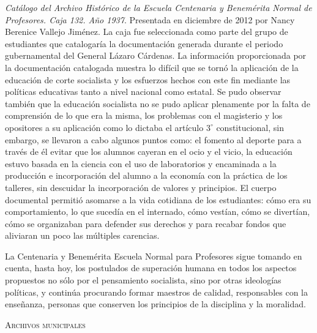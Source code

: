 \smallskip 
\noindent \textsl{Catálogo del Archivo Histórico de la 
Escuela Centenaria y Benemérita Normal de Profesores. Caja 132. Año 
1937}. Presentada en diciembre de 2012 por Nancy Berenice Vallejo 
Jiménez. La caja fue seleccionada como parte del grupo de estudiantes 
que catalogaría la documentación generada durante el periodo 
gubernamental del General Lázaro Cárdenas. La información proporcionada 
por la documentación catalogada muestra lo difícil que se tornó la 
aplicación de la educación de corte socialista y los esfuerzos hechos 
con este fin mediante las políticas educativas tanto a nivel nacional 
como estatal. Se pudo observar también que la educación  socialista no 
se pudo aplicar  plenamente por la falta de comprensión de lo que era 
la misma, los problemas con el magisterio y los opositores a su 
aplicación como lo dictaba el artículo $3^\circ$ constitucional, sin embargo, 
se llevaron a cabo algunos puntos como:  el fomento al deporte para  a 
través de él evitar que los alumnos cayeran en el ocio y el vicio, la 
educación estuvo basada en la ciencia con el uso de laboratorios y 
encaminada a la producción e incorporación del alumno a la economía con 
la práctica de los talleres, sin descuidar la incorporación de valores 
y principios. El cuerpo documental permitió asomarse a la vida 
cotidiana de los estudiantes: cómo era su comportamiento, lo que 
sucedía en el internado, cómo vestían, cómo se divertían, cómo se 
organizaban para defender sus derechos y para recabar fondos que 
aliviaran un poco las múltiples carencias.

La Centenaria y Benemérita Escuela Normal para Profesores sigue 
tomando en cuenta, hasta hoy, los postulados de superación humana 
en todos los aspectos propuestos no sólo por el pensamiento socialista, 
sino por otras ideologías políticas, y continúa procurando formar 
maestros de calidad, responsables con la enseñanza, personas que 
conserven los principios de la disciplina y la moralidad.
\enlargethispage{\baselineskip}

\smallskip
\noindent \textsc{Archivos municipales}

